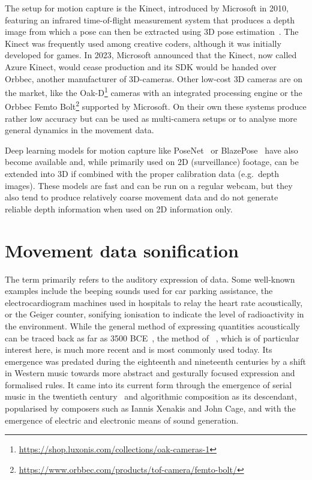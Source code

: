 The  setup for motion capture is the Kinect, introduced by Microsoft in 2010, featuring an infrared time-of-flight measurement system that produces a depth image from which a pose can then be extracted using \ac{3D} pose estimation~\parencite[see][]{poseEstimationPaper}.
The Kinect was frequently used among creative coders, although it was initially developed for games.
In 2023, Microsoft announced that the Kinect, now called Azure Kinect, would cease production and its \ac{SDK} would be handed over Orbbec, another manufacturer of \ac{3D}-cameras.
Other low-cost 3D cameras are on the market, like the Oak-D\footnote{\url{https://shop.luxonis.com/collections/oak-cameras-1}} cameras with an integrated processing engine or the Orbbec Femto Bolt\footnote{\url{https://www.orbbec.com/products/tof-camera/femto-bolt/}} supported by Microsoft.
On their own these systems produce rather low accuracy but can be used as multi-camera setups or to analyse more general dynamics in the movement data.

Deep learning models for motion capture like PoseNet~\parencite{kendall2016posenet} or BlazePose~\parencite{bazarevsky2020blazepose} have also become available and, while primarily used on \ac{2D} (surveillance) footage, can be extended into \ac{3D} if combined with the proper calibration data (e.g.\ depth images).
These models are fast and can be run on a regular webcam, but they also tend to produce relatively coarse movement data and do not generate reliable depth information when used on \ac{2D} information only.

\section{Movement data sonification}
\label{sec:movement-data-sonification}

The term  primarily refers to the auditory expression of data.
Some well-known examples include the beeping sounds used for car parking assistance, the electrocardiogram machines used in hospitals to relay the heart rate acoustically, or the Geiger counter, sonifying ionisation to indicate the level of radioactivity in the environment.
While the general method of expressing quantities acoustically can be traced back as far as 3500 BCE~\parencite[178]{sonificationPreHistory}, the method of ~\parencite[Chapter~15]{sonificationHandbook}, which is of particular interest here, is much more recent and is most commonly used today.
Its emergence was predated during the eighteenth and nineteenth centuries by a shift in Western music towards more abstract and gesturally focused expression and formalised rules.
It came into its current form through the emergence of serial music in the twentieth century~\parencite[179-180]{sonificationPreHistory} and algorithmic composition as its descendant, popularised by composers such as Iannis Xenakis and John Cage, and with the emergence of electric and electronic means of sound generation.

